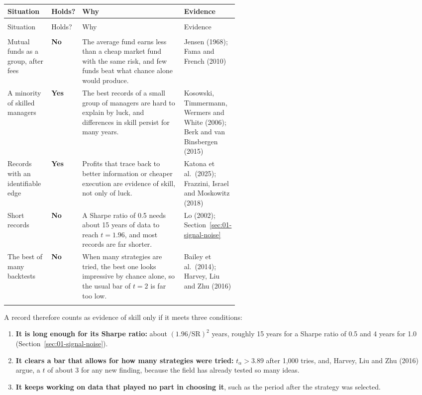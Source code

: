 \begingroup
\small
\setlength{\LTpre}{6pt}\setlength{\LTpost}{6pt}
\begin{longtable}{@{}>{\raggedright\arraybackslash}p{0.19\linewidth}>{\raggedright\arraybackslash}p{0.13\linewidth}>{\raggedright\arraybackslash}p{}>{\raggedright\arraybackslash}p{0.22\linewidth}@{}}
\toprule
Situation & Holds? & Why & Evidence \\
\midrule
\endfirsthead
\multicolumn{4}{@{}l}{\emph{(continued)}} \\
\toprule
Situation & Holds? & Why & Evidence \\
\midrule
\endhead
\midrule
\multicolumn{4}{r@{}}{\emph{(continued on the next page)}} \\
\endfoot
\bottomrule
\endlastfoot
Mutual funds as a group, after fees & \textbf{No} & The average fund earns less than a cheap market fund with the same risk, and few funds beat what chance alone would produce. & Jensen (1968); Fama and French (2010) \\*
A minority of skilled managers & \textbf{Yes} & The best records of a small group of managers are hard to explain by luck, and differences in skill persist for many years. & Kosowski, Timmermann, Wermers and White (2006); Berk and van Binsbergen (2015) \\*
Records with an identifiable edge & \textbf{Yes} & Profits that trace back to better information or cheaper execution are evidence of skill, not only of luck. & Katona et al.\ (2025); Frazzini, Israel and Moskowitz (2018) \\*
Short records & \textbf{No} & A Sharpe ratio of 0.5 needs about 15 years of data to reach $t = 1.96$, and most records are far shorter. & Lo (2002); Section~\ref{sec:01-signal-noise} \\*
The best of many backtests & \textbf{No} & When many strategies are tried, the best one looks impressive by chance alone, so the usual bar of $t = 2$ is far too low. & Bailey et al.\ (2014); Harvey, Liu and Zhu (2016) \\*
\end{longtable}
\addtocounter{table}{-1}%
\endgroup

A record therefore counts as evidence of skill only if it meets three conditions:

\begin{enumerate}
  \item \textbf{It is long enough for its Sharpe ratio:} about $(1.96/\mathrm{SR})^2$ years, roughly 15 years for a Sharpe ratio of 0.5 and 4 years for 1.0 (Section~\ref{sec:01-signal-noise}).
  \item \textbf{It clears a bar that allows for how many strategies were tried:} $t_\alpha > 3.89$ after 1,000 tries, and, Harvey, Liu and Zhu (2016) argue, a $t$ of about 3 for any new finding, because the field has already tested so many ideas.
  \item \textbf{It keeps working on data that played no part in choosing it}, such as the period after the strategy was selected.
\end{enumerate}

